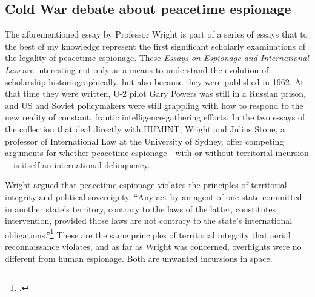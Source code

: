 \documentclass[11pt]{memoir}
\begin{document}
\begin{refsegment}
\subsection{Cold War debate about peacetime espionage}
The aforementioned essay by Professor Wright is part of a series of essays that to the best of my knowledge represent the first significant scholarly examinations of the legality of peacetime espionage. These \emph{Essays on Espionage and International Law} are interesting not only as a means to understand the evolution of scholarship historiographically, but also because they were published in 1962. At that time they were written, U-2 pilot Gary Powers was still in a Russian prison, and US and Soviet policymakers were still grappling with how to respond to the new reality of constant, frantic intelligence-gathering efforts. In the two essays of the collection that deal directly with HUMINT, Wright and Julius Stone, a professor of International Law at the University of Sydney, offer competing arguments for whether peacetime espionage---with or without territorial incursion---is itself an international delinquency.

Wright argued that peacetime espionage violates the principles of territorial integrity and political sovereignty. ``Any act by an agent of one state committed in another state's territory, contrary to the laws of the latter, constitutes intervention, provided those laws are not contrary to the state's international obligations.''\footcite[p.~13]{wright_espionage_1962} These are the same principles of territorial integrity that aerial reconnaissance violates, and as far as Wright was concerned, overflights were no different from human espionage. Both are unwanted incursions in space.


\end{refsegment}
\end{document}
